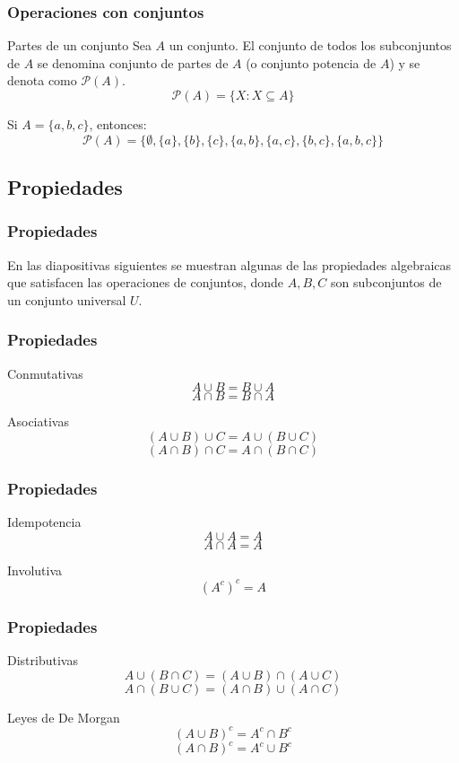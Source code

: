 \documentclass{beamer}
\begin{document}
\begin{frame}
\frametitle{Operaciones con conjuntos}
\begin{block}{Partes de un conjunto}
Sea $A$ un conjunto. El conjunto de todos los subconjuntos de $A$ se denomina conjunto de partes de $A$ (o conjunto potencia de $A$) y se denota como $\mathcal{P}(A)$.
\[\mathcal{P}(A) = \{X:X\subseteq A\}\]
\end{block}
Si $A=\{a,b,c\}$, entonces:
\[\mathcal{P}(A) = \{\emptyset, \{a\},\{b\},\{c\}, \{a,b\}, \{a,c\},\{b,c\},\{a,b,c\} \}\]
\end{frame}

\subsection{Propiedades}

\begin{frame}
\frametitle{Propiedades}
En las diapositivas siguientes se muestran algunas de las propiedades algebraicas que satisfacen las operaciones de conjuntos, donde $A,B,C$ son subconjuntos de un conjunto universal $U$.
\end{frame}



\begin{frame}
\frametitle{Propiedades}
\begin{block}{Conmutativas}
\[A\cup B = B\cup A\]
\[A\cap B = B\cap A\]
\end{block}

\begin{block}{Asociativas}
\[(A\cup B)\cup C = A\cup (B\cup C)\]
\[(A\cap B)\cap C = A\cap (B\cap C)\]
\end{block}

\end{frame}





\begin{frame}
\frametitle{Propiedades}
\begin{block}{Idempotencia}
\[A\cup A = A\]
\[A\cap A = A\]
\end{block}

\begin{block}{Involutiva}
\[(A^c)^c = A\]
\end{block}

\end{frame}




\begin{frame}
\frametitle{Propiedades}
\begin{block}{Distributivas}
\[A\cup (B \cap C) = (A\cup B)\cap (A\cup C)\]
\[A\cap (B \cup C) = (A\cap B)\cup (A\cap C)\]
\end{block}

\begin{block}{Leyes de De Morgan}
\[(A\cup B)^c = A^c\cap B^c\]
\[(A\cap B)^c = A^c\cup B^c\]
\end{block}

\end{frame}
\end{document}
